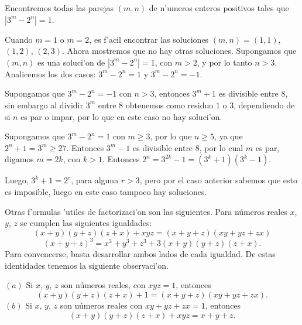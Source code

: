 \begin{ejemplo}
Encontremos todas las parejas $(m,n)$ de n'umeros enteros positivos 
tales que $|3^m - 2^n|=1$.
\end{ejemplo}
Cuando $m=1$ o $m=2$, es f'acil encontrar las soluciones $(m,n)=(1,1)$, 
$(1,2)$, $(2,3)$. Ahora
mostremos que no hay otras soluciones. Supongamos que $(m,n)$ es una 
soluci'on de $|3^m - 2^n|=1$, con $m > 2$, y por lo tanto $n > 3$. Analicemos 
los dos casos: $3^m - 2^n=1$ y $3^m - 2^n=-1$.

\noindent Supongamos que $3^m - 2^n=-1$ con $n > 3$, entonces $3^m+1$ es 
divisible entre $8$, sin embargo
al dividir $3^m$ entre $8$ obtenemos como residuo $1$ o $3$, dependiendo de 
si $n$ es par o impar, por lo que
en este caso no hay soluci'on.

\noindent Supongamos que $3^m - 2^n=1$ con $m\geq  3$, por lo que $n\geq 5$, 
ya que $2^n+1=3^m\geq 27$. Entonces $3^m-1$ es divisible entre $8$, por lo
cual $m$ es par, digamos $m=2k$, con $k >1$. Entonces 
$2^n = 3^{2k}-1=(3^k+1)(3^k-1)$. 

Luego,
$3^k+1=2^r$, para alguna $r >3$, pero por el caso anterior sabemos que esto 
es imposible, luego en este caso tampoco hay soluciones. 


\ve

\noindent Otras  f'ormulas  'utiles de factorizaci'on son las siguientes.
Para n\'{u}meros reales $x$, $y$, $z$ se cumplen las siguientes igualdades:
\begin{equation}
\label{productodetres}
(x+y)(y+z)(z+x)+xyz=(x+y+z)(xy+yz+zx)
\end{equation}
\begin{equation}
(x+y+z)^{3}=x^{3}+y^{3}+z^{3}+3(x+y)(y+z)(z+x).
\end{equation}
Para convencerse, basta desarrollar ambos lados de cada igualdad.
De estas identidades tenemos la siguiente observaci'on. 

\begin{observacion}
$(a)$\; Si $x$, $y$, $z$ son n\'{u}meros reales, con $xyz=1$, entonces
\begin{equation}
(x+y)(y+z)(z+x)+1=(x+y+z)(xy+yz+zx).
\end{equation}
\label{observacionabcigual1}
$(b)$\; Si $x$, $y$, $z$ son n\'{u}meros reales con $xy+yz+zx=1$, entonces
\begin{equation}
(x+y)(y+z)(z+x)+xyz=x+y+z.
\end{equation}
\end{observacion}

\ve
\vei



